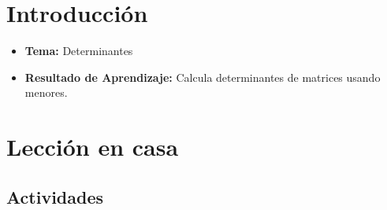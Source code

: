 \documentclass[a4,11pt]{aleph-notas}
\begin{document}
\encabezado


\section*{Introducción}

\begin{itemize}
    \item \textbf{Tema:} Determinantes
    \item \textbf{Resultado de Aprendizaje:} Calcula determinantes de matrices usando menores.
\end{itemize}

\section*{Lección en casa}

\subsection*{Actividades}
\end{document}
